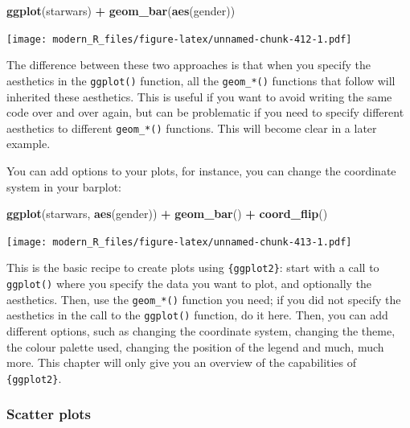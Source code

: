 \documentclass[]{gitbook}
\newenvironment{Shaded}{\begin{snugshade}}{\end{snugshade}}
\newcommand{\KeywordTok}[1]{\textcolor[rgb]{0.13,0.29,0.53}{\textbf{#1}}}
\newcommand{\NormalTok}[1]{#1}
\newcommand{\OperatorTok}[1]{\textcolor[rgb]{0.81,0.36,0.00}{\textbf{#1}}}
\newcommand{\StringTok}[1]{\textcolor[rgb]{0.31,0.60,0.02}{#1}}
\begin{document}
\begin{Shaded}
\begin{Highlighting}[]
\KeywordTok{ggplot}\NormalTok{(starwars) }\OperatorTok{+}
\StringTok{  }\KeywordTok{geom_bar}\NormalTok{(}\KeywordTok{aes}\NormalTok{(gender))}
\end{Highlighting}
\end{Shaded}

\texttt{[image: modern\_R\_files/figure-latex/unnamed-chunk-412-1.pdf]}

The difference between these two approaches is that when you specify the aesthetics in the \texttt{ggplot()} function,
all the \texttt{geom\_*()} functions that follow will inherited these aesthetics. This is useful if you want to avoid
writing the same code over and over again, but can be problematic if you need to specify different aesthetics
to different \texttt{geom\_*()} functions. This will become clear in a later example.

You can add options to your plots, for instance, you can change the coordinate system in your barplot:

\begin{Shaded}
\begin{Highlighting}[]
\KeywordTok{ggplot}\NormalTok{(starwars, }\KeywordTok{aes}\NormalTok{(gender)) }\OperatorTok{+}
\StringTok{  }\KeywordTok{geom_bar}\NormalTok{() }\OperatorTok{+}
\StringTok{  }\KeywordTok{coord_flip}\NormalTok{()}
\end{Highlighting}
\end{Shaded}

\texttt{[image: modern\_R\_files/figure-latex/unnamed-chunk-413-1.pdf]}

This is the basic recipe to create plots using \texttt{\{ggplot2\}}: start with a call to \texttt{ggplot()} where you specify
the data you want to plot, and optionally the aesthetics. Then, use the \texttt{geom\_*()} function you need; if you
did not specify the aesthetics in the call to the \texttt{ggplot()} function, do it here. Then, you can add different
options, such as changing the coordinate system, changing the theme, the colour palette used, changing the
position of the legend and much, much more. This chapter will only give you an overview of the capabilities
of \texttt{\{ggplot2\}}.

\hypertarget{scatter-plots}{%
\subsubsection{Scatter plots}\label{scatter-plots}}
\end{document}
